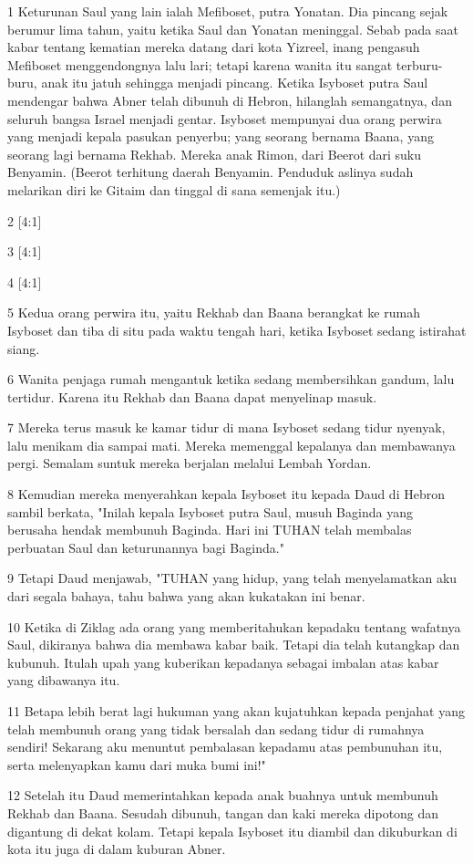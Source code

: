 \par 1 Keturunan Saul yang lain ialah Mefiboset, putra Yonatan. Dia pincang sejak berumur lima tahun, yaitu ketika Saul dan Yonatan meninggal. Sebab pada saat kabar tentang kematian mereka datang dari kota Yizreel, inang pengasuh Mefiboset menggendongnya lalu lari; tetapi karena wanita itu sangat terburu-buru, anak itu jatuh sehingga menjadi pincang. Ketika Isyboset putra Saul mendengar bahwa Abner telah dibunuh di Hebron, hilanglah semangatnya, dan seluruh bangsa Israel menjadi gentar. Isyboset mempunyai dua orang perwira yang menjadi kepala pasukan penyerbu; yang seorang bernama Baana, yang seorang lagi bernama Rekhab. Mereka anak Rimon, dari Beerot dari suku Benyamin. (Beerot terhitung daerah Benyamin. Penduduk aslinya sudah melarikan diri ke Gitaim dan tinggal di sana semenjak itu.)
\par 2 [4:1]
\par 3 [4:1]
\par 4 [4:1]
\par 5 Kedua orang perwira itu, yaitu Rekhab dan Baana berangkat ke rumah Isyboset dan tiba di situ pada waktu tengah hari, ketika Isyboset sedang istirahat siang.
\par 6 Wanita penjaga rumah mengantuk ketika sedang membersihkan gandum, lalu tertidur. Karena itu Rekhab dan Baana dapat menyelinap masuk.
\par 7 Mereka terus masuk ke kamar tidur di mana Isyboset sedang tidur nyenyak, lalu menikam dia sampai mati. Mereka memenggal kepalanya dan membawanya pergi. Semalam suntuk mereka berjalan melalui Lembah Yordan.
\par 8 Kemudian mereka menyerahkan kepala Isyboset itu kepada Daud di Hebron sambil berkata, "Inilah kepala Isyboset putra Saul, musuh Baginda yang berusaha hendak membunuh Baginda. Hari ini TUHAN telah membalas perbuatan Saul dan keturunannya bagi Baginda."
\par 9 Tetapi Daud menjawab, "TUHAN yang hidup, yang telah menyelamatkan aku dari segala bahaya, tahu bahwa yang akan kukatakan ini benar.
\par 10 Ketika di Ziklag ada orang yang memberitahukan kepadaku tentang wafatnya Saul, dikiranya bahwa dia membawa kabar baik. Tetapi dia telah kutangkap dan kubunuh. Itulah upah yang kuberikan kepadanya sebagai imbalan atas kabar yang dibawanya itu.
\par 11 Betapa lebih berat lagi hukuman yang akan kujatuhkan kepada penjahat yang telah membunuh orang yang tidak bersalah dan sedang tidur di rumahnya sendiri! Sekarang aku menuntut pembalasan kepadamu atas pembunuhan itu, serta melenyapkan kamu dari muka bumi ini!"
\par 12 Setelah itu Daud memerintahkan kepada anak buahnya untuk membunuh Rekhab dan Baana. Sesudah dibunuh, tangan dan kaki mereka dipotong dan digantung di dekat kolam. Tetapi kepala Isyboset itu diambil dan dikuburkan di kota itu juga di dalam kuburan Abner.

